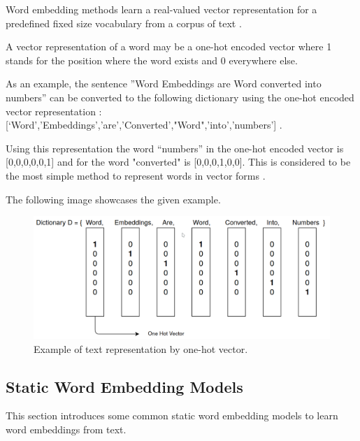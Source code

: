     \par  Word embedding methods learn a real-valued vector representation for a predefined fixed size vocabulary from a corpus  of text \cite{Brownlee2017}.
   
    \par A vector representation of a word may be a one-hot encoded vector where 1 stands for the position where the word exists and 0 everywhere else. 
    
    \par As an example, the sentence ”Word Embeddings are Word converted into numbers” can be converted to the following dictionary using the one-hot encoded vector representation : [‘Word’,’Embeddings’,’are’,’Converted’,"Word",’into’,’numbers’] .

    \par Using this representation the word “numbers” in the one-hot encoded vector is [0,0,0,0,0,1] and for the word "converted" is [0,0,0,1,0,0]. This is considered to be the most simple method to represent words in vector forms \cite{Vidhya2017}.

    \par The following image showcases the given example.
    
    
    \begin{figure}[htb]
        \centering
        \includegraphics[scale = 0.23]{Sections/3StateOfTheArt/3_images/one_hot_encoding.png}
        \caption{Example of text representation by one-hot vector.}   
    \end{figure}
    
    
    

 

    \newpage

    \subsection{Static Word Embedding Models}
    \label{sec:static}
    \par This section introduces some common static word embedding models to learn word embeddings from text.


